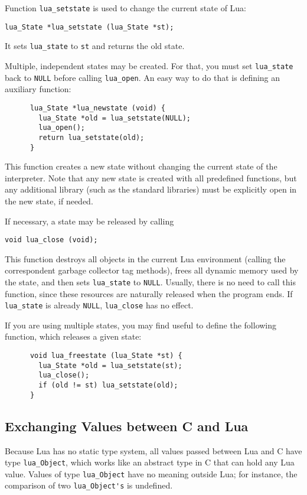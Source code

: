 \documentclass[11pt]{article}
\newcommand{\Deffunc}[1]{\index{#1}}
\begin{document}
Function \verb|lua_setstate| is used to change the current state
of Lua:\Deffunc{lua_setstate}
\begin{verbatim}
lua_State *lua_setstate (lua_State *st);
\end{verbatim}
It sets \verb|lua_state| to \verb|st| and returns the old state.

Multiple, independent states may be created.
For that, you must set \verb|lua_state| back to \verb|NULL| before
calling \verb|lua_open|.
An easy way to do that is defining an auxiliary function:
\begin{verbatim}
      lua_State *lua_newstate (void) {
        lua_State *old = lua_setstate(NULL);
        lua_open();
        return lua_setstate(old);
      }
\end{verbatim}
This function creates a new state without changing the current state
of the interpreter.
Note that any new state is created with all predefined functions,
but any additional library (such as the standard libraries) must be
explicitly open in the new state, if needed.

If necessary, a state may be released by calling\Deffunc{lua_close}
\begin{verbatim}
void lua_close (void);
\end{verbatim}
This function destroys all objects in the current Lua environment
(calling the correspondent garbage collector tag methods),
frees all dynamic memory used by the state,
and then sets \verb|lua_state| to \verb|NULL|.
Usually, there is no need to call this function,
since these resources are naturally released when the program ends.
If \verb|lua_state| is already \verb|NULL|,
\verb|lua_close| has no effect.

If you are using multiple states,
you may find useful to define the following function,
which releases a given state:
\begin{verbatim}
      void lua_freestate (lua_State *st) {
        lua_State *old = lua_setstate(st);
        lua_close();
        if (old != st) lua_setstate(old);
      }
\end{verbatim}

\subsection{Exchanging Values between C and Lua} \label{valuesCLua}
Because Lua has no static type system,
all values passed between Lua and C have type
\verb|lua_Object|\Deffunc{lua_Object},
which works like an abstract type in C that can hold any Lua value.
Values of type \verb|lua_Object| have no meaning outside Lua;
for instance,
the comparison of two \verb|lua_Object's| is undefined.
\end{document}
